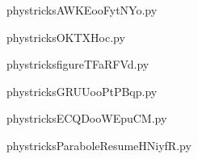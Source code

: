 
    \newcommand{\CaptionFigAWKEooFytNYo}{<+Type your caption here+>}
    \begin{center}
        
    \end{center}
    phystricksAWKEooFytNYo.py

    

    \clearpage
    


    \newcommand{\CaptionFigOKTXHoc}{<+Type your caption here+>}
    \begin{center}
        
    \end{center}
    phystricksOKTXHoc.py

    

    \clearpage
    


    \newcommand{\CaptionFigfigureTFaRFVd}{<+Type your caption here+>}
    \begin{center}
        
    \end{center}
    phystricksfigureTFaRFVd.py

    

    \clearpage
    


    \newcommand{\CaptionFigGRUUooPtPBqp}{<+Type your caption here+>}
    \begin{center}
        
    \end{center}
    phystricksGRUUooPtPBqp.py

    

    \clearpage
    


    \newcommand{\CaptionFigECQDooWEpuCM}{<+Type your caption here+>}
    \begin{center}
        
    \end{center}
    phystricksECQDooWEpuCM.py

    

    \clearpage
    


    \newcommand{\CaptionFigParaboleResumeHNiyfR}{<+Type your caption here+>}
    \begin{center}
        
    \end{center}
    phystricksParaboleResumeHNiyfR.py

